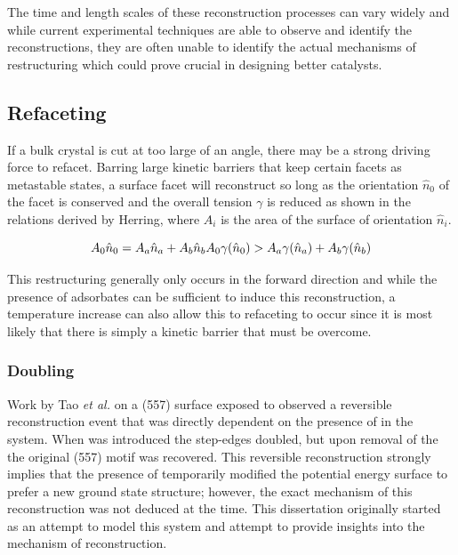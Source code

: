 The time and length scales of these reconstruction processes can vary widely
and while current experimental techniques are able to observe and identify the
reconstructions, they are often unable to identify the actual mechanisms of
restructuring which could prove crucial in designing better catalysts.

\subsection{Refaceting}
If a bulk crystal is cut at too large of an angle, there may be a strong
driving force to refacet. Barring large kinetic barriers that keep certain
facets as metastable states, a surface facet will reconstruct so long as the
orientation $\hat{n}_0$ of the facet is conserved and the overall tension $\gamma$ is
reduced as shown in the relations derived by Herring\citep{}, where $A_i$ is the area of the surface of orientation $\hat{n}_i$.

\begin{equation}
A_0\hat{n}_0 = A_a\hat{n}_a + A_b\hat{n}_b \\
A_0\gamma(\hat{n}_0) > A_a\gamma(\hat{n}_a) + A_b\gamma(\hat{n}_b)
\end{equation}

This restructuring generally only occurs in the forward direction and while the
presence of adsorbates can be sufficient to induce this reconstruction, a
temperature increase can also allow this to refaceting to occur since it is
most likely that there is simply a kinetic barrier that must be overcome. 

\subsubsection{Doubling}
Work by Tao {\it et al.} on a  (557) surface exposed to  observed
a reversible reconstruction event that was directly dependent on the presence
of  in the system. When  was introduced the step-edges doubled,
but upon removal of the  the original (557) motif was recovered. This
reversible reconstruction strongly implies that the presence of 
temporarily modified the potential energy surface to prefer a new ground state
structure; however, the exact mechanism of this reconstruction was not deduced
at the time. This dissertation originally started as an attempt to model this
system and attempt to provide insights into the mechanism of reconstruction. 

